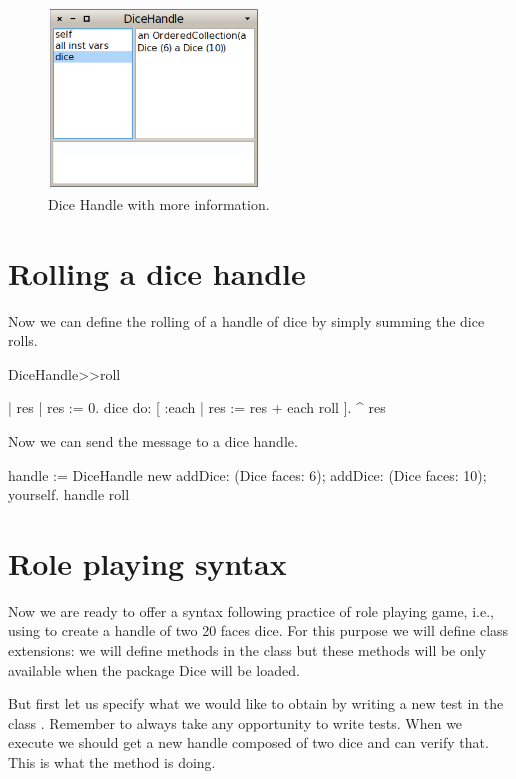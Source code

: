 \documentclass[a4paper,10pt,twoside]{book}
\begin{document}
\begin{figure}

\begin{center}
\includegraphics[width=0.5\textwidth]{figures/DiceHandleDetail.png}\caption{Dice Handle with more information.\label{diceHandleDetail}}\end{center}
\end{figure}
 
\section{ Rolling a dice handle}
Now we can define the rolling of a handle of dice by simply summing the dice rolls.

\begin{code}{}
DiceHandle>>roll
	
	| res |
	res := 0.
	dice do: [ :each | res := res + each roll ].
	^ res
\end{code}


Now we can send the message  to a dice handle.

\begin{code}{}
handle := DiceHandle new 
		addDice: (Dice faces: 6);
		addDice: (Dice faces: 10);
		yourself.
handle roll
\end{code}

\section{ Role playing syntax}
Now we are ready to offer a syntax following practice of role playing game, i.e., using  to create a handle of two 20 faces dice.  For this purpose we will define class extensions: we will define methods in the class  but these methods will be only available when the package Dice will be loaded. 

But first let us specify  what we would like to obtain by writing a new  test in the class . Remember
to always take  any opportunity to write tests.  When we execute  we  should get a new handle  composed of two
dice and can verify that. This is what the method  is doing.
\end{document}

